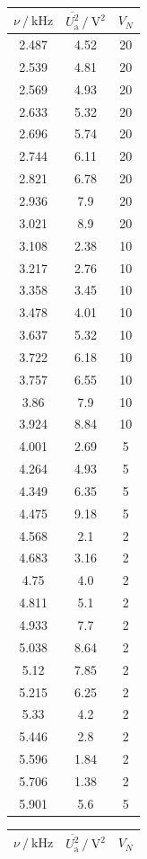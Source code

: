 \begin{table}[h]
\begin{tabular}[t]{S S S}
    \bottomrule
  \end{tabular}
  \begin{tabular}[t]{S S S}
    \toprule
    {$\nu\:/\:\si{\kilo\hertz}$} & {$\overline{U_\text{a}^2}\:/\:\si{\volt\squared}$} & {$V_N$}\\
    \midrule

    2.487 & 4.52 & 20\\
    2.539 & 4.81 & 20\\
    2.569 & 4.93 & 20\\
    2.633 & 5.32 & 20\\
    2.696 & 5.74 & 20\\
    2.744 & 6.11 & 20\\
    2.821 & 6.78 & 20\\
    2.936 & 7.9 & 20\\
    3.021 & 8.9 & 20\\
    3.108 & 2.38 & 10\\
    3.217 & 2.76 & 10\\
    3.358 & 3.45 & 10\\
    3.478 & 4.01 & 10\\
    3.637 & 5.32 & 10\\
    3.722 & 6.18 & 10\\
    3.757 & 6.55 & 10\\
    3.86 & 7.9 & 10\\
    3.924 & 8.84 & 10\\
    4.001 & 2.69 & 5\\
    4.264 & 4.93 & 5\\
    4.349 & 6.35 & 5\\
    4.475 & 9.18 & 5\\
    4.568 & 2.1 & 2\\
    4.683 & 3.16 & 2\\
    4.75 & 4.0 & 2\\
    4.811 & 5.1 & 2\\
    4.933 & 7.7 & 2\\
    5.038 & 8.64 & 2\\
    5.12 & 7.85 & 2\\
    5.215 & 6.25 & 2\\
    5.33 & 4.2 & 2\\
    5.446 & 2.8 & 2\\
    5.596 & 1.84 & 2\\
    5.706 & 1.38 & 2\\
    5.901 & 5.6 & 5\\
  \bottomrule
\end{tabular}
\begin{tabular}[t]{S S S}
  \toprule
  {$\nu\:/\:\si{\kilo\hertz}$} & {$\overline{U_\text{a}^2}\:/\:\si{\volt\squared}$} & {$V_N$}\\
  \midrule


\end{tabular}
\end{table}

